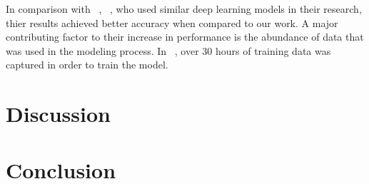 \documentclass[conference]{IEEEtran}
\begin{document}
In comparison with  ~\cite{kapur_alterego:_2018}, ~\cite{janke_emg--speech:_2017}, who used similar deep learning models in their research, thier results achieved better accuracy when compared to our work. A major contributing factor to their increase in performance is the abundance of data that was used in the modeling process. In ~\cite{kapur_alterego:_2018}, over 30 hours of training data was captured in order to train the model.

\section{Discussion}

\section{Conclusion}
%
%



\end{document}

